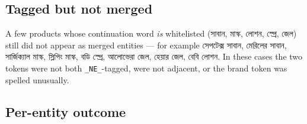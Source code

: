 \documentclass[11pt]{article}
\newcommand{\bn}[1]{{\bnfont #1}}
\begin{document}
\subsection{Tagged but not merged}
A few products whose continuation word \emph{is} whitelisted (\bn{সাবান},
\bn{মাস্ক}, \bn{লোশন}, \bn{স্প্রে}, \bn{জেল}) still did not appear as merged
entities --- for example \bn{সেপটেক্স সাবান}, \bn{মেরিলের সাবান},
\bn{সার্জিক্যাল মাস্ক}, \bn{স্লিপিং মাস্ক}, \bn{বডি স্প্রে}, \bn{আলোভেরা জেল},
\bn{হেয়ার জেল}, \bn{বেবি লোশন}. In these cases the two tokens were not both
\texttt{\_NE\_}-tagged, were not adjacent, or the brand token was spelled
unusually.

\subsection{Per-entity outcome}
\end{document}
